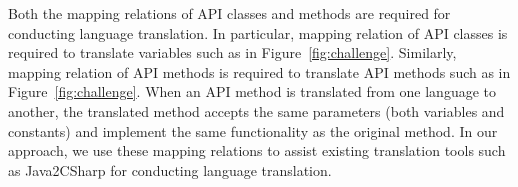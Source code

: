 Both the mapping relations of API classes and methods are required
for conducting language translation. In particular, mapping relation
of API classes is required to translate variables such as
 in Figure~\ref{fig:challenge}. Similarly, mapping
relation of API methods is required to translate API methods such as
 in Figure~\ref{fig:challenge}. When an API method is
translated from one language to another, the translated method
accepts the same parameters (both variables and constants) and
implement the same functionality as the original method. In our approach,
we use these mapping relations to assist existing translation
tools such as Java2CSharp for conducting language translation.
